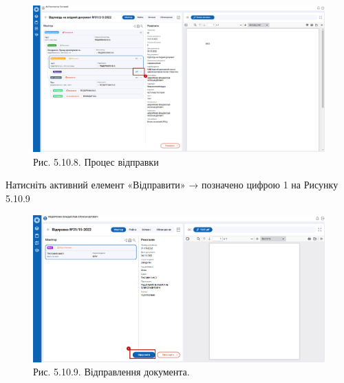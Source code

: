 \begin{figure}[!htbp]
\centerline{\includegraphics[width=\textwidth]{img/5.10.8.png}}
\caption{Рис. 5.10.8. Процес відправки}
\end{figure}

Натисніть активний елемент «Відправити» → позначено цифрою 1 на Рисунку 5.10.9

\begin{figure}[!htbp]
\centerline{\includegraphics[width=\textwidth]{img/5.10.9.png}}
\caption{Рис. 5.10.9. Відправлення документа.}
\end{figure}

